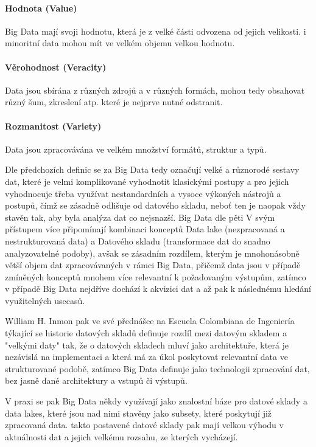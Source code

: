 \documentclass[
  digital,     %
  twoside,     %
  lof,         %
  lot,         %
]{fithesis4}
\begin{document}
\paragraph{Hodnota (Value)}
Big Data mají svoji hodnotu, která je z velké části odvozena od jejich velikosti. i minoritní data mohou mít ve velkém objemu velkou hodnotu. 

\paragraph{Věrohodnost (Veracity)}
Data jsou sbírána z různých zdrojů a v různých formách, mohou tedy obsahovat různý šum, zkreslení atp. které je nejprve nutné odstranit.

\paragraph{Rozmanitost (Variety)}
Data jsou zpracovávána ve velkém množství formátů, struktur a typů.


Dle předchozích definic se za Big Data tedy označují velké a různorodé sestavy dat, které je velmi komplikované vyhodnotit klasickými postupy a pro jejich vyhodnocuje třeba využívat nestandardních a vysoce výkoných nástrojů a postupů, čímž se zásadně odlišuje od datového skladu, neboť ten je naopak vždy stavěn tak, aby byla analýza dat co nejsnazší.  Big Data dle pěti V svým přístupem více připomínají kombinaci konceptů Data lake (nezpracovaná a nestrukturovaná data) a Datového skladu (transformace dat do snadno analyzovatelné podoby), avšak se zásadním rozdílem, kterým je mnohonásobně větší objem dat zpracovávaných v rámci Big Data, přičemž data jsou v případě zmíněných konceptů mnohem více relevantní k požadovaným výstupům, zatímco v případě Big Data nejdříve dochází k akvizici dat a až pak k následnému hledání využitelných usecasů.

William H. Inmon pak ve své přednášce na Escuela Colombiana de Ingeniería týkající se historie datových skladů definuje rozdíl mezi datovým skladem a "velkými daty" tak, že o datových skladech mluví jako architektuře, která je nezávislá na implementaci a která má za úkol poskytovat relevantní data ve strukturované podobě, zatímco Big Data definuje jako technologii zpracování dat, bez jasně dané architektury a vstupů či výstupů. \parencite{Inmon2021}

V praxi se pak Big Data někdy využívají jako znalostní báze pro datové sklady a data lakes, které jsou nad nimi stavěny jako subsety, které poskytují již zpracovaná data. takto postavené datové sklady pak mají velkou výhodu v aktuálnosti dat a jejich velkému rozsahu, ze kterých vycházejí. 
\end{document}
